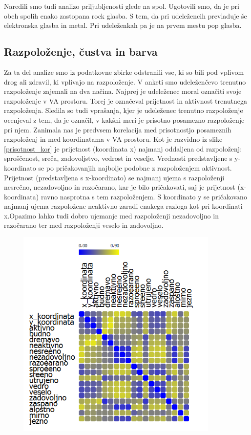 \documentclass[a4paper, 12pt]{book}
\begin{document}
{Naredili smo tudi analizo priljubljenosti glede na spol. Ugotovili smo, da je pri obeh spolih enako zastopana rock glasba. S tem, da pri udeležencih prevladuje še elektronska glasba in metal. Pri udeleženkah pa je na prvem mestu pop glasba. 


\subsection{Razpoloženje, čustva in barva}
\label{razcusbar}

Za ta del analize smo iz podatkovne zbirke odstranili vse, ki so bili pod vplivom drog ali zdravil, ki vplivajo na razpoloženje. V anketi smo udeleženčevo trenutno razpoloženje zajemali na dva načina. Najprej je udeleženec moral označiti svoje razpoloženje v VA prostoru. Torej je označeval prijetnost in aktivnost trenutnega razpoloženja. Sledila so tudi vprašanja, kjer je udeleženec trenutno razpoloženje ocenjeval z tem, da je označil, v kakšni meri je prisotno posamezno razpoloženje pri njem. Zanimala nas je predvsem korelacija med prisotnostjo posameznih razpoloženj in med koordinatama v VA prostoru. Kot je razvidno iz slike \ref{prisotnost_kor} je prijetnost (koordinata x) najmanj oddaljena od razpoloženj: sproščenost, sreča, zadovoljstvo, vedrost in veselje. Vrednosti predstavljene s y-koordinato se po pričakovanjih najbolje podobne z razpoloženjem aktivnost. Prijetnost (predstavljena s x-koordinato) se najmanj ujema s razpoloženji nesrečno, nezadovoljno in razočarano, kar je bilo pričakovati, saj je prijetnost (x-koordinata) ravno nasprotna s tem razpoloženjem. S koordinato y se pričakovano najmanj ujema razpoložene neaktivno zaradi enakega razloga kot pri koordinati x.Opazimo lahko tudi dobro ujemanje med razpoloženji nezadovoljno in razočarano ter med razpoloženji veselo in zadovoljno. 

\begin{figure}[hbt]
\centering
\includegraphics[width=10cm]{images/korelacija.png}


\end{figure}}
\end{document}
